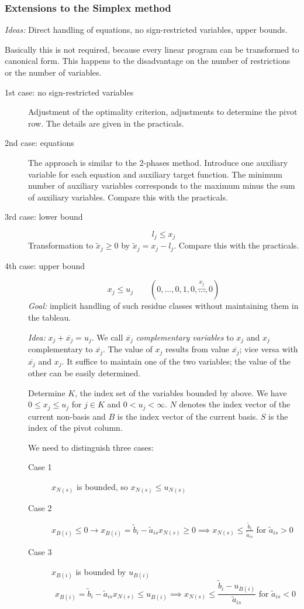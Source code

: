 \documentclass[a4paper]{article}
\numberwithin{lecref}{subsection}
\begin{document}
\subsubsection{Extensions to the Simplex method}

\emph{Ideas:} Direct handling of equations, no sign-restricted variables, upper bounds.

Basically this is not required, because every linear program can be transformed to canonical form.
This happens to the disadvantage on the number of restrictions or the number of variables.

\begin{description}
	\item[1st case: no sign-restricted variables]
		Adjustment of the optimality criterion, adjustments to determine the pivot row.
		The details are given in the practicals.
	\item[2nd case: equations]
		The approach is similar to the 2-phases method. Introduce one auxiliary variable for each equation and auxiliary target function.
		The minimum number of auxiliary variables corresponds to the maximum minus the sum of auxiliary variables.
		Compare this with the practicals.
	\item[3rd case: lower bound]
		\[ l_j \leq x_j \]
		Transformation to $\tilde x_j \geq 0$ by $\tilde x_j = x_j - l_j$. Compare this with the practicals.
	\item[4th case: upper bound]
		\[ x_j \leq u_j \qquad (0, \dots, 0, 1, 0, \overbrace{\dots}^{x_j}, 0) \]
		\emph{Goal:} implicit handling of such residue classes without maintaining them in the tableau.

		\emph{Idea:} $x_j + \overline{x_j} = u_j$.
		We call $\overline{x_j}$ \emph{complementary variables} to $x_j$ and $x_j$ complementary to $\overline{x_j}$.
		The value of $x_j$ results from value $\overline{x_j}$; vice versa with $\overline{x_j}$ and $x_j$.
		It suffice to maintain one of the two variables; the value of the other can be easily determined.

		Determine $K$, the index set of the variables bounded by above. We have $0 \leq x_j \leq u_j$ for $j \in K$ and $0 < u_j < \infty$.
		$N$ denotes the index vector of the current non-basis and $B$ is the index vector of the current basis.
		$S$ is the index of the pivot column.

		We need to distinguish three cases:
		\begin{description}
			\item[Case 1] $x_{N(s)}$ is bounded, so $x_{N(s)} \leq u_{N(s)}$
			\item[Case 2] $x_{B(i)} \leq 0 \to x_{B(i)} = \tilde b_i - \tilde a_{is} x_{N(s)} \geq 0 \implies x_{N(s)} \leq \frac{\tilde b_i}{\tilde a_{is}}$ for $\tilde a_{is} > 0$
			\item[Case 3] $x_{B(i)}$ is bounded by $u_{B(i)}$
				\[ x_{B(i)} = \tilde b_i - \tilde a_{is} x_{N(s)} \leq u_{B(i)} \implies x_{N(s)} \leq \frac{\tilde b_i - u_{B(i)}}{\tilde a_{is}} \text{ for } \tilde a_{is} < 0 \]
		\end{description}


\end{description}
\end{document}
